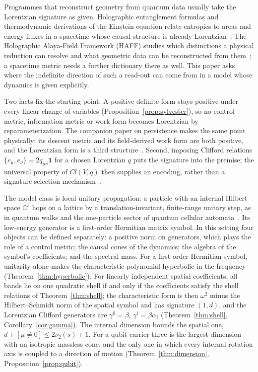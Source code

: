 \documentclass[12pt]{article}
\theoremstyle{definition}
\theoremstyle{remark}
\begin{document}
Programmes that reconstruct geometry from quantum data usually take the Lorentzian signature as given. Holographic entanglement formulas and thermodynamic derivations of the Einstein equation relate entropies to areas and energy fluxes in a spacetime whose causal structure is already Lorentzian~\cite{RyuTakayanagi2006,Jacobson1995}. The Holographic Alaya-Field Framework (HAFF) studies which distinctions a physical reduction can resolve and what geometric data can be reconstructed from them~\cite{Liu2026PaperA,Liu2026PaperB}; a spacetime metric needs a further dictionary there as well. This paper asks where the indefinite direction of such a read-out can come from in a model whose dynamics is given explicitly.

Two facts fix the starting point. A positive definite form stays positive under every linear change of variables (Proposition~\ref{prop:sylvester}), so no control metric, information metric or work form becomes Lorentzian by reparameterization. The companion paper on persistence makes the same point physically: its descent metric and its field-derived work form are both positive, and the Lorentzian form is a third structure~\cite{Liu2026QRAIF_B}. Second, imposing Clifford relations $\{e_\mu,e_\nu\}=2q_{\mu\nu}\mathbf 1$ for a chosen Lorentzian $q$ puts the signature into the premise; the universal property of $Cl(V,q)$ then supplies an encoding, rather than a signature-selection mechanism~\cite{Hestenes1966,Doran2003}.

The model class is local unitary propagation: a particle with an internal Hilbert space $\mathbb C^s$ hops on a lattice by a translation-invariant, finite-range unitary step, as in quantum walks and the one-particle sector of quantum cellular automata~\cite{BialynickiBirula1994,Meyer1996,Strauch2006,BisioDArianoTosini2015,DArianoPerinotti2014}. Its low-energy generator is a first-order Hermitian matrix symbol. In this setting four objects can be defined separately: a positive norm on generators, which plays the role of a control metric; the causal cones of the dynamics; the algebra of the symbol's coefficients; and the spectral mass. For a first-order Hermitian symbol, unitarity alone makes the characteristic polynomial hyperbolic in the frequency (Theorem~\ref{thm:hyperbolic}). For linearly independent spatial coefficients, all bands lie on one quadratic shell if and only if the coefficients satisfy the shell relations of Theorem~\ref{thm:shell}; the characteristic form is then $\omega^2$ minus the Hilbert--Schmidt norm of the spatial symbol and has signature $(1,d)$, and the Lorentzian Clifford generators are $\gamma^0=\beta$, $\gamma^i=\beta\alpha_i$ (Theorem~\ref{thm:shell}, Corollary~\ref{cor:gamma}). The internal dimension bounds the spatial one, $d+[\mu\neq0]\le2\nu_2(s)+1$. For a qubit carrier three is the largest dimension with an isotropic massless cone, and the only one in which every internal rotation axis is coupled to a direction of motion (Theorem~\ref{thm:dimension}, Proposition~\ref{prop:qubit}).
\end{document}
